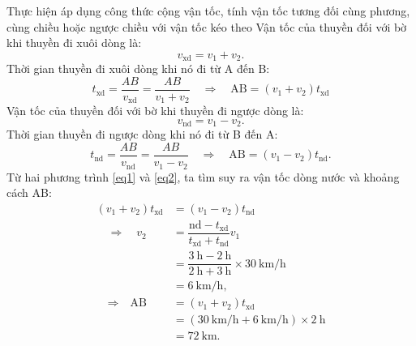 \begin{dang}{Thực hiện áp dụng công thức cộng vận tốc, tính vận tốc tương đối cùng phương, cùng chiều hoặc ngược chiều với vận tốc kéo theo}
{		Vận tốc của thuyền đối với bờ khi thuyền đi xuôi dòng là:
		$$v_{\text{xd}}=v_1+v_2.$$
		Thời gian thuyền đi xuôi dòng khi nó đi từ A đến B:
		\begin{equation}\label{eq1}
			t_{\text{xd}}=\dfrac{AB}{v_{\text{xd}}}= \dfrac{AB}{v_1+v_2}\quad \Rightarrow\quad \text{AB}=(v_1+v_2)t_{\text{xd}}
		\end{equation}
		Vận tốc của thuyền đối với bờ khi thuyền đi ngược dòng là:
		$$v_{\text{nd}}=v_1-v_2.$$
		Thời gian thuyền đi ngược dòng khi nó đi từ B đến A:
		\begin{equation}\label{eq2}
			t_{\text{nd}}=\dfrac{AB}{v_{\text{nd}}}= \dfrac{AB}{v_1-v_2}\quad\Rightarrow\quad \text{AB}=(v_1-v_2)t_\text{nd}.
		\end{equation}
		Từ hai phương trình \eqref{eq1} và \eqref{eq2}, ta tìm suy ra vận tốc dòng nước và khoảng cách AB:
		\begin{align*}
			(v_1+v_2)t_{\text{xd}}&=(v_1-v_2)t_{\text{nd}}\\
			\quad\Rightarrow\quad	v_2&=\dfrac{\text{nd}-t_\text{xd}}{t_{\text{xd}}+t_\text{nd}}v_1\\
			&=\dfrac{\SI{3}{\hour}-\SI{2}{\hour}}{\SI{2}{\hour}+\SI{3}{\hour}}\times\SI{30}{\kilo\meter/\hour}\\
			&=\SI{6}{\kilo\meter/\hour},\\
			\quad\Rightarrow\quad \text{AB}&=(v_1+v_2)t_\text{xd}\\
			&=(\SI{30}{\kilo\meter/\hour}+\SI{6}{\kilo\meter/\hour})\times\SI{2}{\hour}\\
			&=\SI{72}{\kilo\meter}.
		\end{align*}
	}
\end{dang}